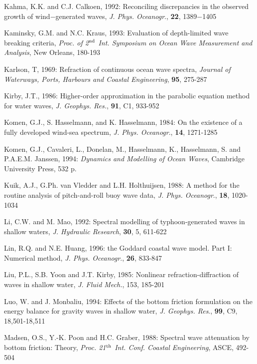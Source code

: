 \documentclass[12pt]{book}
\begin{document}
\begin{thebibliography}{10}
Kahma, K.K. and C.J. Calkoen, 1992: Reconciling discrepancies in the observed growth of
wind$-$generated waves, {\it J. Phys. Oceanogr}., {\bf 22}, 1389$-$1405

Kaminsky, G.M. and N.C. Kraus, 1993: Evaluation of depth-limited wave breaking criteria, {\it Proc.
of 2$^{{\rm nd}}$ Int. Symposium on Ocean Wave Measurement and Analysis}, New Orleans, 180-193

Karlson, T, 1969: Refraction of continuous ocean wave spectra, {\it Journal of Waterways, Ports, Harbours
and Coastal Engineering}, {\bf 95}, 275-287

Kirby, J.T., 1986: Higher-order approximation in the parabolic equation method for water waves, {\it J.
Geophys. Res.}, {\bf 91}, C1, 933-952

Komen, G.J., S. Hasselmann, and K. Hasselmann, 1984: On the existence of a fully developed wind-sea
spectrum, {\it J. Phys. Oceanogr}., {\bf 14}, 1271-1285

Komen, G.J., Cavaleri, L., Donelan, M., Hasselmann, K., Hasselmann, S. and P.A.E.M. Janssen, 1994:
{\it Dynamics and Modelling of Ocean Waves}, Cambridge University Press, 532 p.

Kuik, A.J., G.Ph. van Vledder and L.H. Holthuijsen, 1988: A method for the routine  analysis of
pitch-and-roll buoy wave data, {\it J. Phys. Oceanogr}., {\bf 18}, 1020-1034

Li, C.W. and M. Mao, 1992: Spectral modelling of typhoon-generated waves in shallow waters, {\it J.
Hydraulic Research}, {\bf 30}, 5, 611-622

Lin, R.Q. and N.E. Huang, 1996: the Goddard coastal wave model. Part I: Numerical method, {\it J. Phys.
Oceanogr}., {\bf 26}, 833-847

Liu, P.L., S.B. Yoon and J.T. Kirby, 1985: Nonlinear refraction-diffraction of waves in shallow water, {\it J. Fluid
Mech.}, 153, 185-201

Luo, W. and J. Monbaliu, 1994: Effects of the bottom friction formulation on the energy balance for gravity
waves in shallow water, {\it J. Geophys. Res}., {\bf 99}, C9, 18,501-18,511

Madsen, O.S., Y.-K. Poon and H.C. Graber, 1988: Spectral wave attenuation by bottom friction: Theory,
{\it Proc. 21$^{{\rm th}}$ Int. Conf. Coastal Engineering}, ASCE, 492-504


\end{thebibliography}
\end{document}
